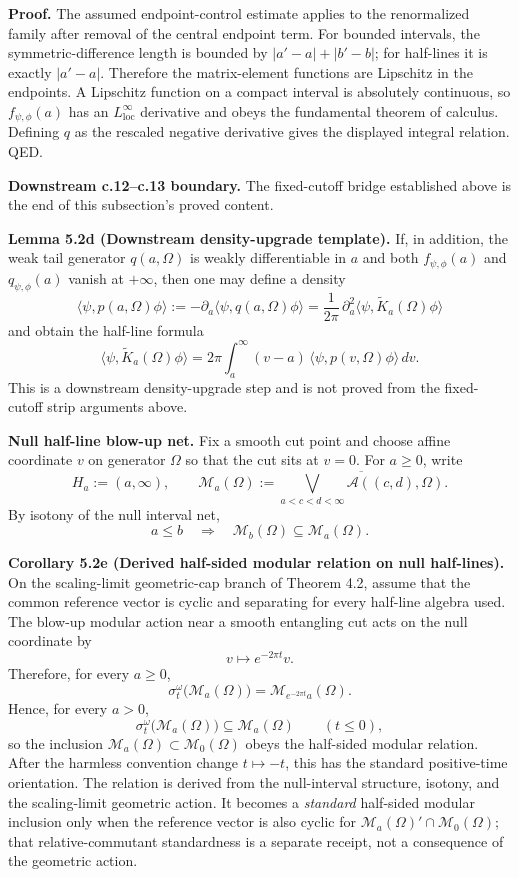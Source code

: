 \textbf{Proof.} The assumed endpoint-control estimate applies to the renormalized family after removal of the central endpoint term. For bounded intervals, the symmetric-difference length is bounded by \(|a'-a|+|b'-b|\); for half-lines it is exactly \(|a'-a|\). Therefore the matrix-element functions are Lipschitz in the endpoints. A Lipschitz function on a compact interval is absolutely continuous, so \(f_{\psi,\phi}(a)\) has an \(L^\infty_{\mathrm{loc}}\) derivative and obeys the fundamental theorem of calculus. Defining \(q\) as the rescaled negative derivative gives the displayed integral relation. QED.

\textbf{Downstream c.12--c.13 boundary.} The fixed-cutoff bridge established above is the end of this subsection's proved content.

\textbf{Lemma 5.2d (Downstream density-upgrade template).} If, in addition, the weak tail generator \(q(a,\Omega)\) is weakly differentiable in \(a\) and both \(f_{\psi,\phi}(a)\) and \(q_{\psi,\phi}(a)\) vanish at \(+\infty\), then one may define a density
\[
\langle\psi,p(a,\Omega)\phi\rangle
:=
-\partial_a\langle\psi,q(a,\Omega)\phi\rangle
=
\frac{1}{2\pi}\,\partial_a^2 \langle\psi,\widetilde K_a(\Omega)\phi\rangle
\]
and obtain the half-line formula
\[
\langle\psi,\widetilde K_a(\Omega)\phi\rangle
=
2\pi\int_a^\infty (v-a)\,\langle\psi,p(v,\Omega)\phi\rangle\,dv.
\]
This is a downstream density-upgrade step and is not proved from the fixed-cutoff strip arguments above.

\textbf{Null half-line blow-up net.} Fix a smooth cut point and choose affine coordinate \(v\) on generator \(\Omega\) so that the cut sits at \(v=0\). For \(a\ge 0\), write
\[
H_a:=(a,\infty),
\qquad
\mathcal M_a(\Omega)
:=
\overline{\bigvee_{a<c<d<\infty}\mathcal A((c,d),\Omega)}.
\]
By isotony of the null interval net,
\[
a\le b
\quad\Longrightarrow\quad
\mathcal M_b(\Omega)\subseteq \mathcal M_a(\Omega).
\]

\textbf{Corollary 5.2e (Derived half-sided modular relation on null half-lines).} On the scaling-limit geometric-cap branch of Theorem 4.2, assume that the common reference vector is cyclic and separating for every half-line algebra used.  The blow-up modular action near a smooth entangling cut acts on the null coordinate by
\[
v\mapsto e^{-2\pi t}v.
\]
Therefore, for every \(a\ge 0\),
\[
\sigma_t^\omega\bigl(\mathcal M_a(\Omega)\bigr)
=
\mathcal M_{e^{-2\pi t}a}(\Omega).
\]
Hence, for every \(a>0\),
\[
\sigma_t^\omega\bigl(\mathcal M_a(\Omega)\bigr)\subseteq \mathcal M_a(\Omega)
\qquad (t\le 0),
\]
so the inclusion \(\mathcal M_a(\Omega)\subset \mathcal M_0(\Omega)\) obeys the half-sided modular relation. After the harmless convention change \(t\mapsto -t\), this has the standard positive-time orientation. The relation is derived from the null-interval structure, isotony, and the scaling-limit geometric action.  It becomes a \emph{standard} half-sided modular inclusion only when the reference vector is also cyclic for \(\mathcal M_a(\Omega)'\cap\mathcal M_0(\Omega)\); that relative-commutant standardness is a separate receipt, not a consequence of the geometric action.

